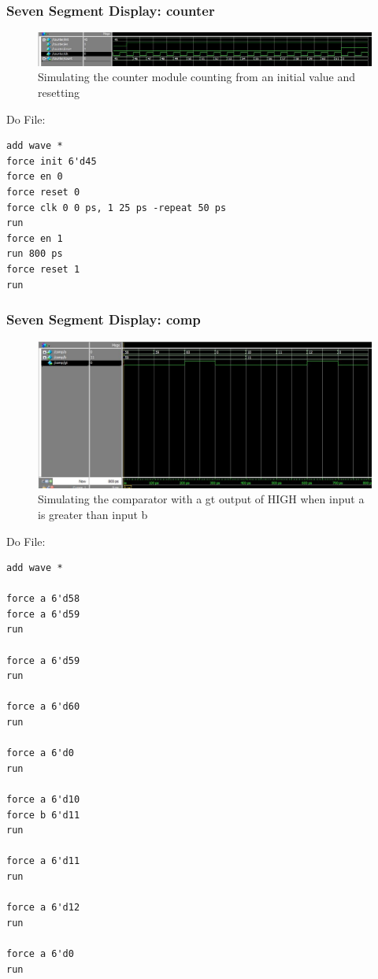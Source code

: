 \documentclass[a4paper]{article}
\begin{document}
\subsubsection{Seven Segment Display: counter}
\begin{figure}[H]
    \includegraphics[width=0.8 \linewidth]{images/countersim.JPG}
    \caption{Simulating the counter module counting from an initial value and resetting}
    \label{countersim}
\end{figure}

Do File:
\begin{Verbatim}
add wave *
force init 6'd45
force en 0
force reset 0
force clk 0 0 ps, 1 25 ps -repeat 50 ps
run
force en 1
run 800 ps
force reset 1
run

\end{Verbatim}

\subsubsection{Seven Segment Display: comp}
\begin{figure}[H]
    \includegraphics[width=0.8 \linewidth]{images/compsim.JPG}
    \caption{Simulating the comparator with a gt output of HIGH when input a is greater than input b}
    \label{compaim}
\end{figure}

Do File:
\begin{Verbatim}
add wave *

force a 6'd58
force a 6'd59
run

force a 6'd59
run

force a 6'd60
run 

force a 6'd0
run 

force a 6'd10
force b 6'd11
run

force a 6'd11
run

force a 6'd12
run

force a 6'd0
run
\end{Verbatim}
\end{document}
